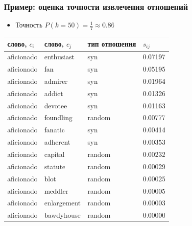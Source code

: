 \begin{frame}
\frametitle{Пример: оценка точности извлечения отношений}

\begin{itemize}
    \item Точность $P(k=50)= \frac{1}{7} \approx 0.86 $
\end{itemize}


\begin{table}[h]\footnotesize
\begin{tabular}{ |l|l|l|l| }
\hline
\bf слово, $c_i$ & \bf  слово, $c_j$ & \bf тип отношения & \bf $s_{ij}$ \\ \hline \hline

aficionado & enthusiast & syn & 0.07197 \\
aficionado & fan & syn & 0.05195 \\
aficionado & admirer & syn & 0.01964 \\
aficionado & addict & syn & 0.01326 \\
aficionado & devotee & syn & 0.01163 \\
\alert{aficionado} & \alert{foundling} & \alert{random} & \alert{0.00777} \\
aficionado & fanatic & syn & 0.00414 \\ \hline
aficionado & adherent & syn & 0.00353 \\
aficionado & capital & random & 0.00232 \\
aficionado & statute & random & 0.00029 \\
aficionado & blot & random & 0.00025 \\
aficionado & meddler & random & 0.00005 \\
aficionado & enlargement & random & 0.00003 \\
aficionado & bawdyhouse & random &  0.00000 \\ 
\hline
\end{tabular}
\end {table}

\end{frame}

